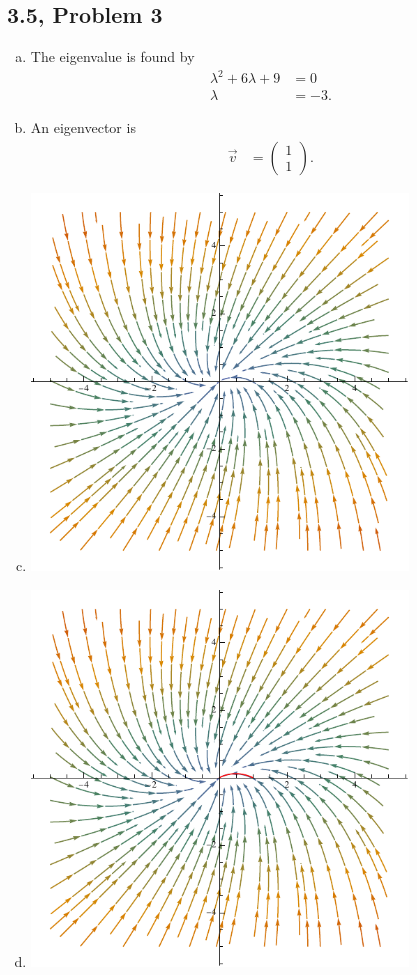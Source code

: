 \documentclass[10pt]{mypackage}
\begin{document}
\subsection{3.5, Problem 3}%
\begin{enumerate}[(a)]
  \item The eigenvalue is found by
    \begin{align*}
      \lambda^2 + 6 \lambda + 9 &= 0\\
      \lambda &= -3.
    \end{align*}
  \item An eigenvector is
    \begin{align*}
      \vec{v} &= \begin{pmatrix}1\\1\end{pmatrix}.
    \end{align*}
  \item \hfill
    \begin{center}
      \includegraphics[width=10cm]{images/3_5_3c.pdf}
    \end{center}
  \item \hfill
    \begin{center}
      \includegraphics[width=10cm]{images/3_5_3d.pdf}

\end{center}
\end{enumerate}
\end{document}
